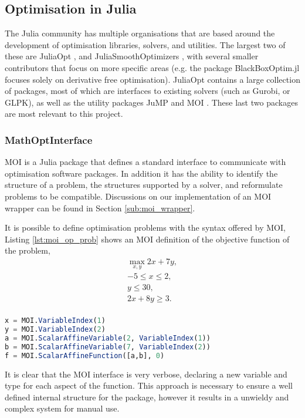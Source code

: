 \subsection{Optimisation in Julia}\label{sub_julia_opt}
The Julia community has multiple organisations that are based around the development of optimisation libraries, solvers, and utilities. The largest two of these are JuliaOpt \cite{JuliaOpt:Language}, and JuliaSmoothOptimizers \cite{JuliaSmoothOptimizers}, with several smaller contributors that focus on more specific areas (e.g. the package BlackBoxOptim.jl focuses solely on derivative free optimisation). JuliaOpt contains a large collection of packages, most of which are interfaces to existing solvers (such as Gurobi, or GLPK), as well as the utility packages \ac{JuMP} \cite{IntroductionJuMP}\cite{Dunning2017JuMP:Optimization} and \ac{MOI} \cite{ManualMathOptInterface}. These last two packages are most relevant to this project.

\subsubsection{MathOptInterface}\label{subsub:mathoptinterface}
\ac{MOI} is a Julia package that defines a standard interface to communicate with optimisation software packages. In addition it has the ability to identify the structure of a problem, the structures supported by a solver, and reformulate problems to be compatible. Discussions on our implementation of an \ac{MOI} wrapper can be found in Section \ref{sub:moi_wrapper}.

It is possible to define optimisation problems with the syntax offered by \ac{MOI}, Listing \ref{lst:moi_op_prob} shows an \ac{MOI} definition of the objective function of the problem,
\begin{equation}
\begin{aligned}
    \max_{x,y} 2x+7y, \\
    -5 \leq x \leq 2, \\
    y \leq 30, \\
    2x + 8y \geq 3. \\
    \label{eqn:example_jump}
\end{aligned}
\end{equation}
\begin{lstlisting}[language=julia,caption={\ac{MOI} definition of an optimisation problem},captionpos=b,label={lst:moi_op_prob}]
x = MOI.VariableIndex(1)
y = MOI.VariableIndex(2)
a = MOI.ScalarAffineVariable(2, VariableIndex(1))
b = MOI.ScalarAffineVariable(7, VariableIndex(2))
f = MOI.ScalarAffineFunction([a,b], 0)
\end{lstlisting}
It is clear that the \ac{MOI} interface is very verbose, declaring a new variable and type for each aspect of the function. This approach is necessary to ensure a well defined internal structure for the package, however it results in a unwieldy and complex system for manual use.

